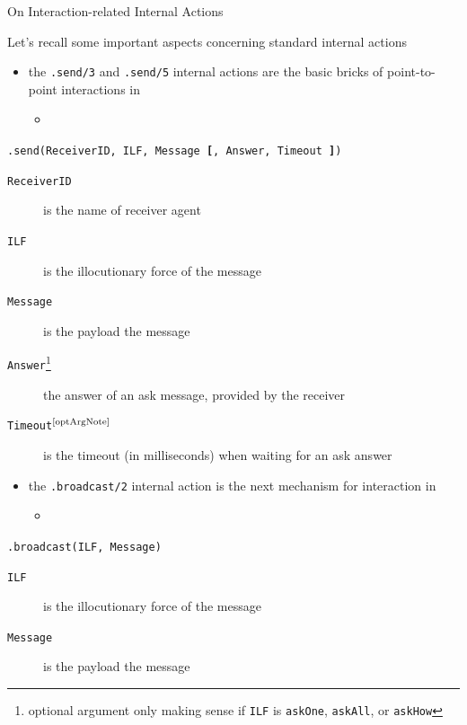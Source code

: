 \documentclass[presentation]{beamer}\mode<presentation>{\usetheme{AMSBolognaFC}}
\begin{document}
\begin{frame}[c,allowframebreaks]{On Interaction-related Internal Actions}

Let's recall some important aspects concerning standard internal actions

\begin{itemize}
    \item the \texttt{.send/3} and \texttt{.send/5} internal actions are the basic bricks of point-to-point interactions in \jason{}
    \begin{itemize}
        \item {}
    \end{itemize}
\end{itemize}

\begin{block}{\texttt{.send(ReceiverID, ILF, Message \textbf{[}, Answer, Timeout \textbf{]})}}
    \begin{description}
        \item[\texttt{ReceiverID}] is the name of receiver agent
        \item[\texttt{ILF}] is the illocutionary force of the message
        \item[\texttt{Message}] is the payload the message
        \item[\texttt{Answer}\footnote{\label{optArgNote}optional argument only making sense if \texttt{ILF} is \texttt{askOne}, \texttt{askAll}, or \texttt{askHow}}] the answer of an ask message, provided by the receiver
        \item[\texttt{Timeout}$^{\text{\ref{optArgNote}}}$] is the timeout (in milliseconds) when waiting for an ask answer 
    \end{description}
\end{block}

\framebreak

\begin{itemize}
    \item the \texttt{.broadcast/2} internal action is the next mechanism for interaction in \jason{}
    \begin{itemize}
        \item {}
    \end{itemize}
\end{itemize}

\begin{block}{\texttt{.broadcast(ILF, Message)}}
    \begin{description}
        \item[\texttt{ILF}] is the illocutionary force of the message
        \item[\texttt{Message}] is the payload the message
    \end{description}
\end{block}


\end{frame}
\end{document}
